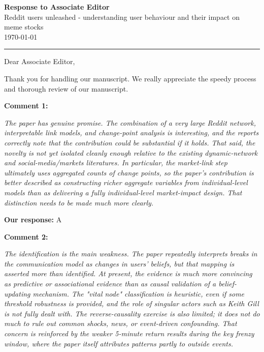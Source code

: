 \documentclass[11pt]{article}
\newcommand{\reviewercomment}[1]{\begin{commentbox}\textit{#1}\end{commentbox}}
\newcommand{\ourresponse}[1]{\textbf{Our response:} #1}
\begin{document}
\begin{center}
  {\Large \textbf{Response to Associate Editor}}\\[0.5em]
  {\large Reddit users unleashed - understanding user behaviour and
  	their impact on meme stocks}\\[0.3em]
  {\small \today}
\end{center}

\vspace{1em}\hrule\vspace{1.5em}

Dear Associate Editor,

Thank you for handling our manuscript. We really appreciate the speedy process and thorough review of our manuscript. 

\bigskip

\textbf{Comment 1:}

\reviewercomment{%
The paper has genuine promise. The combination of a very large Reddit network, interpretable link models, and change-point analysis is interesting, and the reports correctly note that the contribution could be substantial if it holds. That said, the novelty is not yet isolated cleanly enough relative to the existing dynamic-network and social-media/markets literatures. In particular, the market-link step ultimately uses aggregated counts of change points, so the paper's contribution is better described as constructing richer aggregate variables from individual-level models than as delivering a fully individual-level market-impact design. That distinction needs to be made much more clearly.
}

\ourresponse{A
}

\textbf{Comment 2:}

\reviewercomment{%
	The identification is the main weakness. The paper repeatedly interprets breaks in the communication model as changes in users' beliefs, but that mapping is asserted more than identified. At present, the evidence is much more convincing as predictive or associational evidence than as causal validation of a belief-updating mechanism. The "vital node"
	classification is heuristic, even if some threshold robustness is provided, and the role of singular actors such as Keith Gill is not fully dealt with. The reverse-causality exercise is
	also limited; it does not do much to rule out common shocks, news, or event-driven confounding. That concern is reinforced by the weaker 5-minute return results during the key frenzy window, where the paper itself attributes patterns partly to outside events.
}
\end{document}

